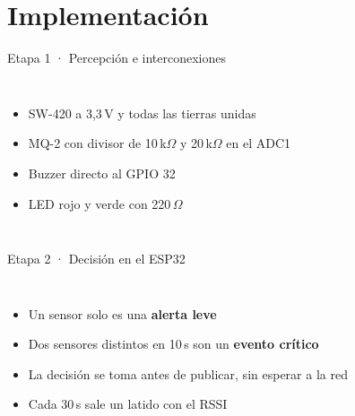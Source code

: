 \documentclass[aspectratio=169,10pt]{beamer}
\begin{document}
\section{Implementación}

\begin{frame}{Etapa 1 · Percepción e interconexiones}
  \begin{columns}[c]
    \centering
    \resizebox{\linewidth}{!}{}
    \small
    \begin{itemize}
      \item SW-420 a 3,3\,V y todas las tierras unidas
      \item MQ-2 con divisor de 10\,k$\Omega$ y 20\,k$\Omega$ en el ADC1
      \item Buzzer directo al GPIO 32
      \item LED rojo y verde con 220\,$\Omega$
    \end{itemize}
  \end{columns}
\end{frame}

\begin{frame}{Etapa 2 · Decisión en el ESP32}
  \begin{columns}[c]
    \centering
    \resizebox{\linewidth}{!}{}\par\vspace{5mm}
    \small
    \begin{itemize}
      \item Un sensor solo es una \textbf{alerta leve}
      \item Dos sensores distintos en 10\,s son un \textbf{evento crítico}
      \item La decisión se toma antes de publicar, sin esperar a la red
      \item Cada 30\,s sale un latido con el RSSI
    \end{itemize}
    \centering
    \resizebox{!}{0.8\textheight}{}
  \end{columns}
\end{frame}
\end{document}

